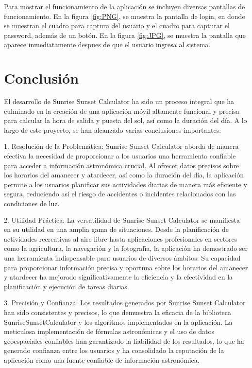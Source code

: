 \documentclass[conference]{IEEEtran}
\begin{document}
Para mostrar el funcionamiento de la aplicación se incluyen diversas pantallas de funcionamiento. En la figura \ref{fig:PNG}, se muestra la pantalla de login, en donde se muestran el cuadro para captura del usuario y el cuadro para capturar el password, además de un botón. En la figura \ref{fig:JPG}, se muestra la pantalla que aparece inmediatamente despues de que el usuario ingresa al sistema.


\section{Conclusión}

El desarrollo de Sunrise Sunset Calculator ha sido un proceso integral que ha culminado en la creación de una aplicación móvil altamente funcional y precisa para calcular la hora de salida y puesta del sol, así como la duración del día. A lo largo de este proyecto, se han alcanzado varias conclusiones importantes:

1. Resolución de la Problemática: Sunrise Sunset Calculator aborda de manera efectiva la necesidad de proporcionar a los usuarios una herramienta confiable para acceder a información astronómica crucial. Al ofrecer datos precisos sobre los horarios del amanecer y atardecer, así como la duración del día, la aplicación permite a los usuarios planificar sus actividades diarias de manera más eficiente y segura, reduciendo así el riesgo de accidentes o incidentes relacionados con las condiciones de luz.

2. Utilidad Práctica: La versatilidad de Sunrise Sunset Calculator se manifiesta en su utilidad en una amplia gama de situaciones. Desde la planificación de actividades recreativas al aire libre hasta aplicaciones profesionales en sectores como la agricultura, la navegación y la fotografía, la aplicación ha demostrado ser una herramienta indispensable para usuarios de diversos ámbitos. Su capacidad para proporcionar información precisa y oportuna sobre los horarios del amanecer y atardecer ha mejorado significativamente la eficiencia y la efectividad en la planificación y ejecución de tareas diarias.

3. Precisión y Confianza: Los resultados generados por Sunrise Sunset Calculator han sido consistentes y precisos, lo que demuestra la eficacia de la biblioteca SunriseSunsetCalculator y los algoritmos implementados en la aplicación. La meticulosa implementación de fórmulas astronómicas y el uso de datos geoespaciales confiables han garantizado la fiabilidad de los resultados, lo que ha generado confianza entre los usuarios y ha consolidado la reputación de la aplicación como una fuente confiable de información astronómica.
\end{document}
